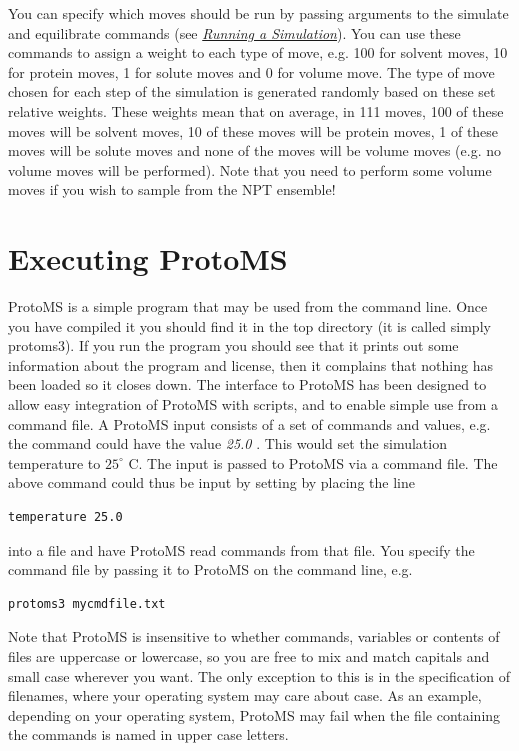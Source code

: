 \documentclass[letterpaper,10pt,english]{manual}
\begin{document}
You can specify which moves should be run by passing arguments to the simulate and equilibrate commands (see \hyperlink{runcmd}{\emph{Running a Simulation}}). You can use these commands to assign a weight to each type of move, e.g. 100 for solvent moves, 10 for protein moves, 1 for solute moves and 0 for volume move. The type of move chosen for each step of the simulation is generated randomly based on these set relative weights. These weights mean that on average, in 111 moves, 100 of these moves will be solvent moves, 10 of these moves will be protein moves, 1 of these moves will be solute moves and none of the moves will be volume moves (e.g. no volume moves will be performed). Note that you need to perform some volume moves if you wish to sample from the NPT ensemble!


\chapter{Executing ProtoMS}

ProtoMS is a simple program that may be used from the command line. Once you have compiled it you should find it in the top directory (it is called simply protoms3). If you run the program you should see that it prints out some information about the program and license, then it complains that nothing has been loaded so it closes down. The interface to ProtoMS has been designed to allow easy integration of ProtoMS with scripts, and to enable simple use from a command file. A ProtoMS input consists of a set of commands and values, e.g. the command  could have the value \emph{25.0} . This would set the simulation temperature to $25^\circ$ C. The input is passed to ProtoMS via a command file. The above command could thus be input by setting by placing the line

\begin{Verbatim}[commandchars=@\[\]]
temperature 25.0
\end{Verbatim}

into a file and have ProtoMS read commands from that file. You specify the command file by passing it to ProtoMS on the command line, e.g.

\begin{Verbatim}[commandchars=@\[\]]
protoms3 mycmdfile.txt
\end{Verbatim}

Note that ProtoMS is insensitive to whether commands, variables or contents of files are uppercase or lowercase, so you are free to mix and match capitals and small case wherever you want. The only exception to this is in the specification of filenames, where your operating system may care about case. As an example, depending on your operating system, ProtoMS may fail when the file containing the commands is named in upper case letters.
\end{document}

